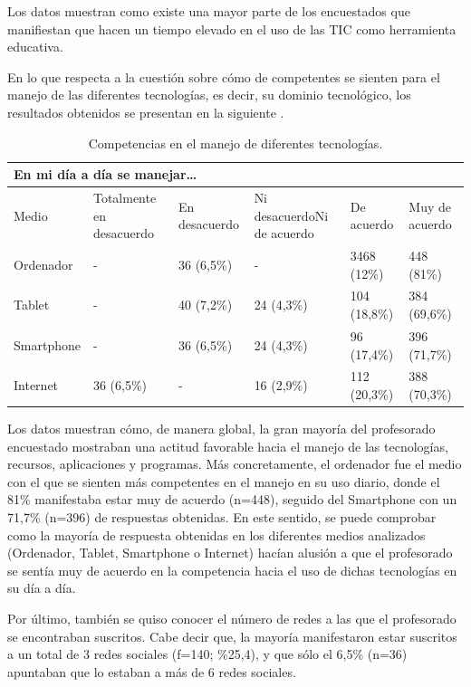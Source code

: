 \documentclass[spanish]{textolivre}
\begin{document}
Los datos muestran como existe una mayor parte de los encuestados que manifiestan que hacen un tiempo elevado en el uso de las TIC como herramienta educativa.

En lo que respecta a la cuestión sobre cómo de competentes se sienten para el manejo de las diferentes tecnologías, es decir, su dominio tecnológico, los resultados obtenidos se presentan en la siguiente . 

\begin{table}[htpb]
\caption{Competencias en el manejo de diferentes tecnologías.}
\label{tab5}
\centering
\begin{tabular}{p{}p{}p{}p{}p{}p{}}
\toprule
\multicolumn{6}{l}{En mi día a día se manejar…}
\\
\midrule
Medio & Totalmente en desacuerdo & En desacuerdo & Ni desacuerdo\/Ni de acuerdo & De acuerdo & Muy de acuerdo
\\ 
\midrule
Ordenador & - & 36 (6,5\%) & - & 3468 (12\%) & 448 (81\%)
\\
Tablet & - & 40 (7,2\%) & 24 (4,3\%) & 104 (18,8\%) & 384 (69,6\%)
\\
Smartphone & - & 36 (6,5\%) & 24 (4,3\%) & 96 (17,4\%) & 396 (71,7\%)
\\
Internet & 36 (6,5\%) & - & 16 (2,9\%) & 112 (20,3\%) & 388 (70,3\%)
\\ 
\bottomrule
\end{tabular}
\end{table}

Los datos muestran cómo, de manera global, la gran mayoría del profesorado encuestado mostraban una actitud favorable hacia el manejo de las tecnologías, recursos, aplicaciones y programas. Más concretamente, el ordenador fue el medio con el que se sienten más competentes en el manejo en su uso diario, donde el 81\% manifestaba estar muy de acuerdo (n=448), seguido del Smartphone con un 71,7\% (n=396) de respuestas obtenidas. En este sentido, se puede comprobar como la mayoría de respuesta obtenidas en los diferentes medios analizados (Ordenador, Tablet, Smartphone o Internet) hacían alusión a que el profesorado se sentía muy de acuerdo en la competencia hacia el uso de dichas tecnologías en su día a día. 

Por último, también se quiso conocer el número de redes a las que el profesorado se encontraban suscritos. Cabe decir que, la mayoría manifestaron estar suscritos a un total de 3 redes sociales (f=140; \%25,4), y que sólo el 6,5\% (n=36) apuntaban que lo estaban a más de 6 redes sociales.
\end{document}
